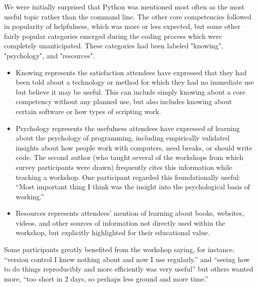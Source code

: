 \documentclass[10pt, twocolumn]{article}
\begin{document}
	We were initially surprised that Python was mentioned most often as the most useful topic rather than the command line.
	The other core competencies followed in popularity of helpfulness,
	which was more or less expected,
	but some other fairly popular categories emerged during the coding process which were completely unanticipated.
	These categories had been labeled "knowing", "psychology", and "resources".
	
    \begin{figure}
    \end{figure}
	
	\begin{itemize}
		\item
		Knowing represents the satisfaction attendees have expressed that they had been told about a technology or method
		for which they had no immediate use but believe it may be useful.
		This can include simply knowing about a core competency without any planned use,
		but also includes knowing about certain software or how types of scripting work.
		
		\item
		Psychology represents the usefulness attendees have expressed of learning about the psychology of programming,
		including empirically validated insights about how people work with computers,
		need breaks,
		or should write code.
		The second author (who taught several of the workshops from which survey participants were drawn)
		frequently cites this information while teaching a workshop. One participant regarded this foundationally useful: ``Most important thing I think was the insight into the psychological basis of working.''
		
		\item
		Resources represents attendees' mention of learning about books, websites, videos, and other sources of information
		not directly used within the workshop,
		but explicitly highlighted for their educational value.
	\end{itemize}
	
	Some participants greatly benefited from the workshop saying, for instance, ``version control I knew nothing about and now I use regularly.'' and ``seeing how to do things reproducibly and more efficiently was very useful''
	 but others wanted more, ``too short in 2 days, so perhaps less ground and more time.''
	
\end{document}
